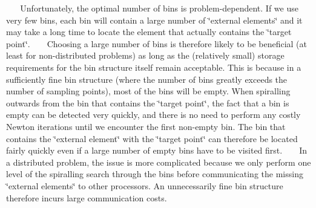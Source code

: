 \begin{DoxyItemize}
\begin{DoxyCodeInclude}

\end{DoxyCodeInclude}
 ~\newline
~\newline
 Unfortunately, the optimal number of bins is problem-\/dependent. If we use very few bins, each bin will contain a large number of \char`\"{}external 
  elements\char`\"{} and it may take a long time to locate the element that actually contains the \char`\"{}target point\char`\"{}. ~\newline
~\newline
 Choosing a large number of bins is therefore likely to be beneficial (at least for non-\/distributed problems) as long as the (relatively small) storage requirements for the bin structure itself remain acceptable. This is because in a sufficiently fine bin structure (where the number of bins greatly exceeds the number of sampling points), most of the bins will be empty. When spiralling outwards from the bin that contains the \char`\"{}target
  point\char`\"{}, the fact that a bin is empty can be detected very quickly, and there is no need to perform any costly Newton iterations until we encounter the first non-\/empty bin. The bin that contains the \char`\"{}external element\char`\"{} with the \char`\"{}target point\char`\"{} can therefore be located fairly quickly even if a large number of empty bins have to be visited first. ~\newline
~\newline
 In a distributed problem, the issue is more complicated because we only perform one level of the spiralling search through the bins before communicating the missing \char`\"{}external elements\char`\"{} to other processors. An unnecessarily fine bin structure therefore incurs large communication costs. ~\newline
~\newline


\end{DoxyItemize}
